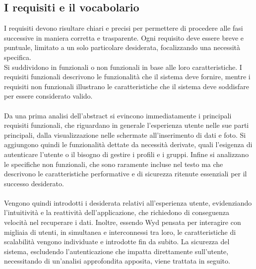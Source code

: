 \subsection{I requisiti e il vocabolario}
I requisiti devono risultare chiari e precisi
per permettere di procedere alle fasi successive in maniera corretta e trasparente.
Ogni requisito deve essere breve e puntuale, limitato a un solo particolare desiderata,
focalizzando una necessità specifica.\\
Si suddividono in funzionali o non funzionali in base alle loro caratteristiche.
I requisiti funzionali descrivono le funzionalità che il sistema deve fornire,
mentre i requisiti non funzionali illustrano le caratteristiche che il sistema deve soddisfare per essere considerato valido.\\
\\
Da una prima analisi dell'abstract si evincono immediatamente i principali requisiti funzionali,
che riguardano in generale l'esperienza utente nelle sue parti principali, 
dalla visualizzazione nelle schermate all'inserimento di dati e foto. 
Si aggiungono quindi le funzionalità dettate da necessità derivate,
quali l'esigenza di autenticare l'utente o il bisogno di gestire i profili e i gruppi.
Infine si analizzano le specifiche non funzionali, 
che sono raramente incluse nel testo ma che descrivono le caratteristiche performative e di sicurezza
ritenute essenziali per il successo desiderato.\\
\\
Vengono quindi introdotti i desiderata relativi all'esperienza utente,
evidenziando l'intuitività e la reattività dell'applicazione, 
che richiedono di conseguenza velocità nel recuperare i dati.
Inoltre, essendo Wyd pensata per interagire con migliaia di utenti, 
in simultanea e interconnessi tra loro, le caratteristiche di scalabilità vengono individuate e introdotte fin da subito.
La sicurezza del sistema, escludendo l'autenticazione che impatta direttamente sull'utente, 
necessitando di un'analisi approfondita apposita, viene trattata in seguito.\\

